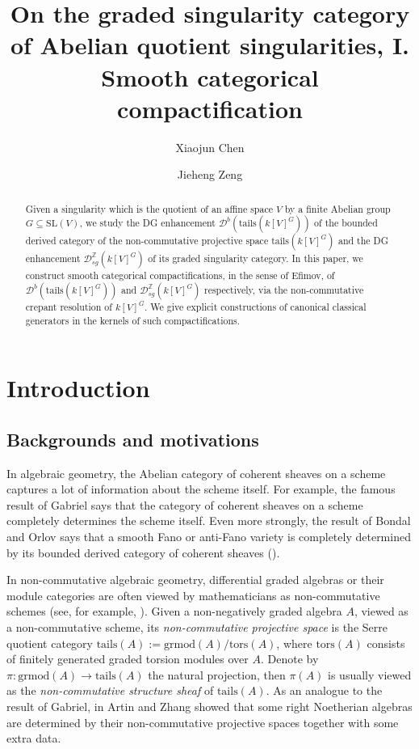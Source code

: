 \documentclass[11pt,reqno]{amsart}
\title[On the graded singularity 
category, I]{On the graded singularity category of
Abelian quotient singularities, I. 
Smooth categorical compactification}
\author{Xiaojun Chen}
\author{Jieheng Zeng}
\date{}
\theoremstyle{definition}
\begin{document}
\begin{abstract}
Given a singularity which is the quotient of an
affine space $V$ by a finite Abelian group
$G \subseteq \mathrm{SL}(V)$, we study
the DG enhancement $\mathcal{D}^{b}
(\mathrm{tails}(k[V]^G))$ of the
bounded derived category
of the non-commutative projective space $\mathrm{tails}(k[V]^G)$
and the
DG enhancement
$\mathcal{D}_{sg}^{\mathbb{Z}}(k[V]^G)$ of its graded singularity category. 
In this paper, we construct smooth categorical 
compactifications, in the sense of Efimov, 
of $\mathcal{D}^b(\mathrm{tails}(k[V]^G))$ and
$\mathcal{D}_{sg}^{\mathbb{Z}}(k[V]^G)$ respectively, 
via the non-commutative crepant resolution of $k[V]^G$.
We give
explicit constructions of canonical classical generators in the kernels of such compactifications.
\end{abstract}

\maketitle

\tableofcontents

\section{Introduction}\label{In}

\subsection{Backgrounds and motivations}
In algebraic geometry, the Abelian category of
coherent sheaves on a scheme captures a lot of information about the scheme itself. For example, the famous result of
Gabriel says that the
category of coherent sheaves 
on a scheme completely determines
the scheme itself. 
Even more strongly,
the result
of Bondal and Orlov says that a smooth Fano or anti-Fano variety is completely
determined by its bounded derived category of coherent sheaves (\cite{BO}).

In non-commutative algebraic geometry, differential graded algebras or
their module categories are often viewed by mathematicians
as non-commutative schemes
(see, for example, \cite{BVdB}). 
Given a non-negatively graded algebra $A$, 
viewed as a non-commutative scheme,
its {\it non-commutative projective space} is the 
Serre quotient category 
$ \mathrm{tails}(A) := \mathrm{grmod}(A)/ \mathrm{tors}(A)$,
where $\mathrm{tors}(A)$ consists of 
finitely generated graded
torsion modules over $A$. 
Denote by
$\pi: \mathrm{grmod}(A) \rightarrow  \mathrm{tails}(A)$
the natural projection, then
$\pi(A)$ is usually viewed as
the {\it non-commutative structure sheaf} of $\mathrm{tails}(A)$. 
As an analogue to 
the result of Gabriel, 
in \cite{AZ} Artin and Zhang showed
that some right Noetherian algebras
are determined by their non-commutative projective spaces together with some extra data.
\end{document}
